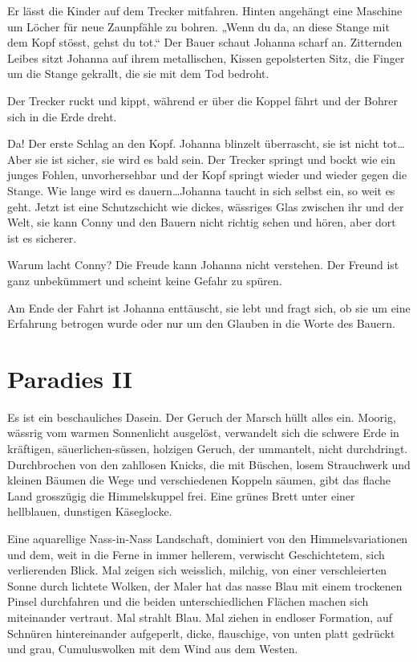 \documentclass[10pt,a5paper]{book}
\begin{document}
Er lässt die Kinder auf dem Trecker mitfahren. Hinten angehängt eine Maschine um Löcher für neue Zaunpfähle zu bohren. „Wenn du da, an diese Stange mit dem Kopf stösst, gehst du tot.“ Der Bauer schaut Johanna scharf an. Zitternden Leibes sitzt Johanna auf ihrem metallischen, Kissen gepolsterten Sitz, die Finger um die Stange gekrallt, die sie mit dem Tod bedroht.

Der Trecker ruckt und kippt, während er über die Koppel fährt und der Bohrer sich in die Erde dreht.

Da! Der erste Schlag an den Kopf. Johanna blinzelt überrascht, sie ist nicht tot\dots Aber sie ist sicher, sie wird es bald sein. Der Trecker springt und bockt wie ein junges Fohlen, unvorhersehbar und der Kopf springt wieder und wieder gegen die Stange. Wie lange wird es dauern\dots Johanna taucht in sich selbst ein, so weit es geht. Jetzt ist eine Schutzschicht wie dickes, wässriges Glas zwischen ihr und der Welt, sie kann Conny und den Bauern nicht richtig sehen und hören, aber dort ist es sicherer.

Warum lacht Conny? Die Freude kann Johanna nicht verstehen. Der Freund ist ganz unbekümmert und scheint keine Gefahr zu spüren.

Am Ende der Fahrt ist Johanna enttäuscht, sie lebt und fragt sich, ob sie um eine Erfahrung betrogen wurde oder nur um den Glauben in die Worte des Bauern.



\section*{Paradies II}



Es ist ein beschauliches Dasein. Der Geruch der Marsch hüllt alles ein. Moorig, wässrig vom warmen Sonnenlicht ausgelöst, verwandelt sich die schwere Erde in kräftigen, säuerlichen-süssen, holzigen Geruch, der ummantelt, nicht durchdringt. Durchbrochen von den zahllosen Knicks, die mit Büschen, losem Strauchwerk und kleinen Bäumen die Wege und verschiedenen Koppeln säumen, gibt das flache Land grosszügig die Himmelskuppel frei. Eine grünes Brett unter einer hellblauen, dunstigen Käseglocke. 

Eine aquarellige Nass-in-Nass Landschaft, dominiert von den Himmelsvariationen und dem, weit in die Ferne in immer hellerem, verwischt Geschichtetem, sich verlierenden Blick. Mal zeigen sich weisslich, milchig, von einer verschleierten Sonne durch lichtete Wolken, der Maler hat das nasse Blau mit einem trockenen Pinsel durchfahren und die beiden unterschiedlichen Flächen machen sich miteinander vertraut. Mal strahlt Blau. Mal ziehen in endloser Formation, auf Schnüren hintereinander aufgeperlt, dicke, flauschige,  von unten platt gedrückt und grau, Cumuluswolken mit dem Wind aus dem Westen.
\end{document}
